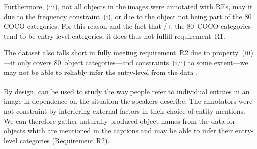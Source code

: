 {Furthermore, (iii), not all objects in the images were annotated with REs, may it due to the frequency constraint~(i), or due to the object not being part of the 80 COCO categories. 
For this reason and the fact that /+ the $80$~COCO categories tend to be entry-level categories, it does thus not fulfill requirement~R1. 
%
%
%

The dataset also falls short in fully meeting requirement~R2 due to property~(iii)---it only covers 80~object categories---and constraints~(i,ii) to some extent---we may not be able to reliably infer the entry-level from the data . 

\paragraph{}
By design, \textit{\flickr} can be used to study the way people refer to individual entities in an image in dependence on the situation the speakers describe. 
The annotators were not constraint by interfering external factors in their choice of entity mentions.  
We can therefore gather naturally produced object names from the data for objects which are mentioned in the captions and may be able to infer their entry-level categories (Requirement R2). 

%

}
